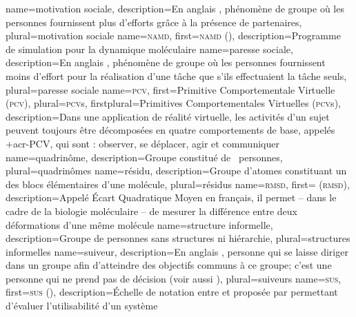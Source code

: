 %
{%
	name={motivation sociale},%
	description={En anglais  , phénomène de groupe où les personnes fournissent plus d'efforts grâce à la présence de partenaires},%
	plural={motivation sociale}%
}
%
{%
	name={\textsc{namd}},%
	first={\textsc{namd} ()},%
	description={Programme de simulation pour la dynamique moléculaire }%
}
%
{%
	name={paresse sociale},%
	description={En anglais  , phénomène de groupe où les personnes fournissent moins d'effort pour la réalisation d'une tâche que s'ils effectuaient la tâche seuls},%
	plural={paresse sociale}%
}
%
{%
	name={\textsc{pcv}},
	first={Primitive Comportementale Virtuelle (\textsc{pcv})},%
	plural={\textsc{pcv}s},%
	firstplural={Primitives Comportementales Virtuelles (\textsc{pcv}s)},%
	description={Dans une application de réalité virtuelle, les activités d'un sujet peuvent toujours être décomposées en quatre comportements de base, appelés \myacro+{acr-PCV}, qui sont : observer, se déplacer, agir et communiquer }
}
%
{%
	name={quadrinôme},%
	description={Groupe constitué de ~personnes},%
	plural={quadrinômes}%
}
%
{%
	name={résidu},%
	description={Groupe d'atomes constituant un des blocs élémentaires d'une molécule},%
	plural={résidus}%
}
%
{%
	name={\textsc{rmsd}},%
	first={ (\textsc{rmsd})},%
	description={Appelé Écart Quadratique Moyen en français, il permet -- dans le cadre de la biologie moléculaire -- de mesurer la différence entre deux déformations d'une même molécule}%
}
%
{%
	name={structure informelle},%
	description={Groupe de personnes sans structures ni hiérarchie},%
	plural={structures informelles}%
}
%
{%
	name={suiveur},%
	description={En anglais , personne qui se laisse diriger dans un groupe afin d'atteindre des objectifs communs à ce groupe; c'est une personne qui ne prend pas de décision (voir aussi )},%
	plural={suiveurs}%
}
%
{%
	name={\textsc{sus}},%
	first={\textsc{sus} ()},%
	description={Échelle de notation entre  et  proposée par  permettant d'évaluer l'utilisabilité d'un système}%
}
